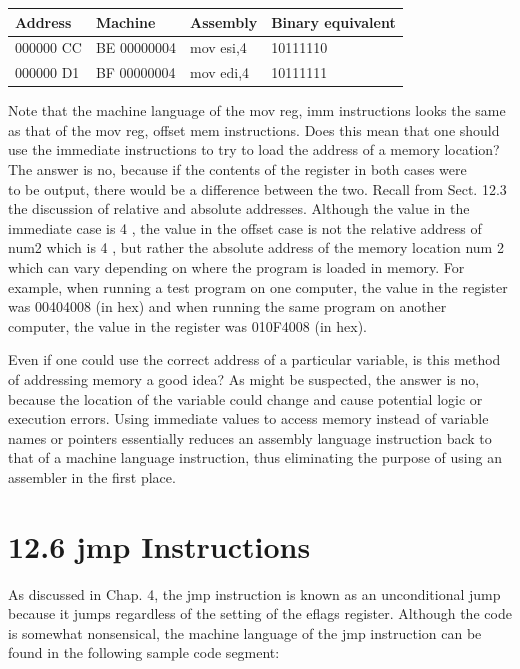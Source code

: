\documentclass[10pt]{article}
\begin{document}
\begin{center}
\begin{tabular}{|l|l|l|l|}
\hline
Address & Machine & Assembly & Binary equivalent \\
\hline
000000 CC & BE 00000004 & mov esi,4 & 10111110 \\
\hline
000000 D1 & BF 00000004 & mov edi,4 & 10111111 \\
\hline
\end{tabular}
\end{center}

Note that the machine language of the mov reg, imm instructions looks the same as that of the mov reg, offset mem instructions. Does this mean that one should use the immediate instructions to try to load the address of a memory location? The answer is no, because if the contents of the register in both cases were\\
to be output, there would be a difference between the two. Recall from Sect. 12.3 the discussion of relative and absolute addresses. Although the value in the immediate case is 4 , the value in the offset case is not the relative address of num2 which is 4 , but rather the absolute address of the memory location num 2 which can vary depending on where the program is loaded in memory. For example, when running a test program on one computer, the value in the register was 00404008 (in hex) and when running the same program on another computer, the value in the register was 010F4008 (in hex).

Even if one could use the correct address of a particular variable, is this method of addressing memory a good idea? As might be suspected, the answer is no, because the location of the variable could change and cause potential logic or execution errors. Using immediate values to access memory instead of variable names or pointers essentially reduces an assembly language instruction back to that of a machine language instruction, thus eliminating the purpose of using an assembler in the first place.

\section*{12.6 jmp Instructions}
As discussed in Chap. 4, the jmp instruction is known as an unconditional jump because it jumps regardless of the setting of the eflags register. Although the code is somewhat nonsensical, the machine language of the jmp instruction can be found in the following sample code segment:
\end{document}
